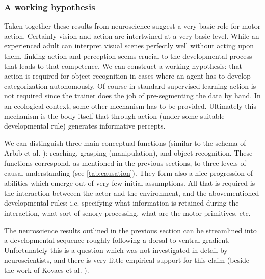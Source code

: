 %
%
%







\subsubsection*{A working hypothesis}


Taken together these results from neuroscience suggest a very basic role
for motor action. Certainly vision and action are
intertwined at a very basic level.  While an
experienced adult can interpret visual scenes perfectly well without
acting upon them, linking action and perception seems crucial to the
developmental process that leads to that competence.  We can construct
a working hypothesis: that action is required for object recognition in
cases where an agent has to develop categorization autonomously. 
Of course in standard supervised learning action is not required since
the trainer does the job of pre-segmenting the data by hand.  In an
ecological context, some other mechanism has to be provided.
Ultimately this mechanism is the body itself that through action
(under some suitable developmental rule) generates informative
percepts.

We can distinguish three main conceptual functions (similar to the 
schema of Arbib et al. \cite{arbib-1981}): reaching, grasping (manipulation), and
object recognition. These functions correspond, as mentioned in the 
previous sections, to three levels of causal understanding (see \ref{tab:causation}).
They form also a nice progression of abilities which emerge out
of very few initial assumptions. All that is required is the 
interaction betweeen the actor and the environment, and the abovementioned
developmental rules: i.e. specifying what information is retained during the
interaction, what sort of senory processing, what are the motor
primitives, etc. 

The neuroscience results outlined in the previous section can be streamlined
into a developmental sequence roughly following a dorsal to ventral
gradient. Unfortunately this is a question which was not investigated in detail
by neuroscientists, and there is very little empirical support for this claim
(beside the work of Kovacs et al. \cite{kovacs00human}).

